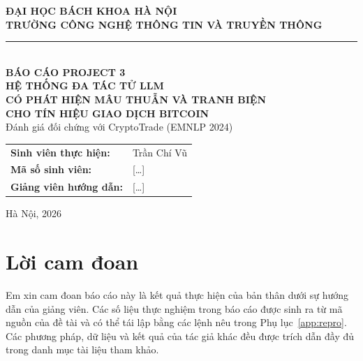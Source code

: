 \documentclass[12pt,a4paper,oneside]{report}
\begin{document}
\begin{titlepage}
\begin{center}
{\large\bfseries ĐẠI HỌC BÁCH KHOA HÀ NỘI}\\[2pt]
{\large\bfseries TRƯỜNG CÔNG NGHỆ THÔNG TIN VÀ TRUYỀN THÔNG}\\[2pt]
\rule{6cm}{0.6pt}\\[3.2cm]
{\Large\bfseries BÁO CÁO PROJECT 3}\\[1.2cm]
{\Large\bfseries HỆ THỐNG ĐA TÁC TỬ LLM\\[6pt]
CÓ PHÁT HIỆN MÂU THUẪN VÀ TRANH BIỆN\\[6pt]
CHO TÍN HIỆU GIAO DỊCH BITCOIN}\\[0.8cm]
{\large Đánh giá đối chứng với CryptoTrade (EMNLP 2024)}\\[3cm]
\begin{tabular}{>{\bfseries}l l}
Sinh viên thực hiện: & Trần Chí Vũ \\
Mã số sinh viên: & [\dots] \\
Giảng viên hướng dẫn: & [\dots] \\
\end{tabular}
\vfill
{\large Hà Nội, 2026}
\end{center}
\end{titlepage}


\chapter*{Lời cam đoan}
Em xin cam đoan báo cáo này là kết quả thực hiện của bản thân dưới sự hướng dẫn của giảng viên.
Các số liệu thực nghiệm trong báo cáo được sinh ra từ mã nguồn của đề tài và có thể tái lập bằng các lệnh
nêu trong Phụ lục~\ref{app:repro}. Các phương pháp, dữ liệu và kết quả của tác giả khác đều được trích dẫn
đầy đủ trong danh mục tài liệu tham khảo.
\end{document}
